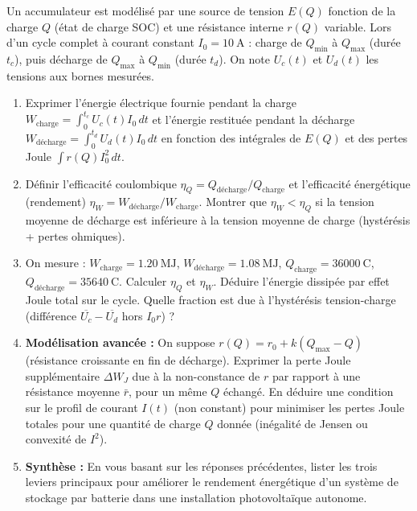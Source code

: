 \documentclass[11pt]{article}
\begin{document}
\begin{exercice}
Un accumulateur est modélisé par une source de tension $E(Q)$ fonction de la charge $Q$ (état de charge SOC) et une résistance interne $r(Q)$ variable. Lors d'un cycle complet à courant constant $I_0 = \SI{10}{\ampere}$ : charge de $Q_{\min}$ à $Q_{\max}$ (durée $t_c$), puis décharge de $Q_{\max}$ à $Q_{\min}$ (durée $t_d$). On note $U_c(t)$ et $U_d(t)$ les tensions aux bornes mesurées.
\begin{enumerate}
    \item Exprimer l'énergie électrique fournie pendant la charge $W_{\text{charge}} = \int_0^{t_c} U_c(t) I_0 \, dt$ et l'énergie restituée pendant la décharge $W_{\text{décharge}} = \int_0^{t_d} U_d(t) I_0 \, dt$ en fonction des intégrales de $E(Q)$ et des pertes Joule $\int r(Q) I_0^2 \, dt$.
    \item Définir l'efficacité coulombique $\eta_Q = Q_{\text{décharge}}/Q_{\text{charge}}$ et l'efficacité énergétique (rendement) $\eta_W = W_{\text{décharge}}/W_{\text{charge}}$. Montrer que $\eta_W < \eta_Q$ si la tension moyenne de décharge est inférieure à la tension moyenne de charge (hystérésis + pertes ohmiques).
    \item On mesure : $W_{\text{charge}} = \SI{1,20}{\mega\joule}$, $W_{\text{décharge}} = \SI{1,08}{\mega\joule}$, $Q_{\text{charge}} = \SI{36000}{\coulomb}$, $Q_{\text{décharge}} = \SI{35640}{\coulomb}$. Calculer $\eta_Q$ et $\eta_W$. Déduire l'énergie dissipée par effet Joule total sur le cycle. Quelle fraction est due à l'hystérésis tension-charge (différence $\overline{U_c} - \overline{U_d}$ hors $I_0 r$) ?
    \item \textbf{Modélisation avancée :} On suppose $r(Q) = r_0 + k(Q_{\max}-Q)$ (résistance croissante en fin de décharge). Exprimer la perte Joule supplémentaire $\Delta W_J$ due à la non-constance de $r$ par rapport à une résistance moyenne $\bar{r}$, pour un même $Q$ échangé. En déduire une condition sur le profil de courant $I(t)$ (non constant) pour minimiser les pertes Joule totales pour une quantité de charge $Q$ donnée (inégalité de Jensen ou convexité de $I^2$).
    \item \textbf{Synthèse :} En vous basant sur les réponses précédentes, lister les trois leviers principaux pour améliorer le rendement énergétique d'un système de stockage par batterie dans une installation photovoltaïque autonome.
\end{enumerate}
\end{exercice}
\end{document}

